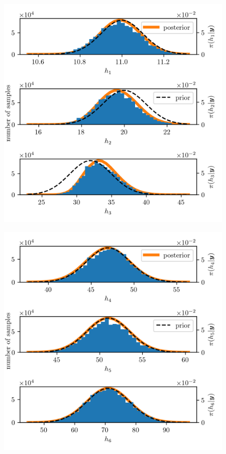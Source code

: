 \begin{figure}[ht!]
	\centering
	\includegraphics{PHdPTPost0.png}
	\caption[]{}
	\label{fig:}
\end{figure}
\begin{figure}[ht!]
	\centering
	\includegraphics{PHdPTPost1.png}
	\caption[]{}
	\label{fig:}
\end{figure}
